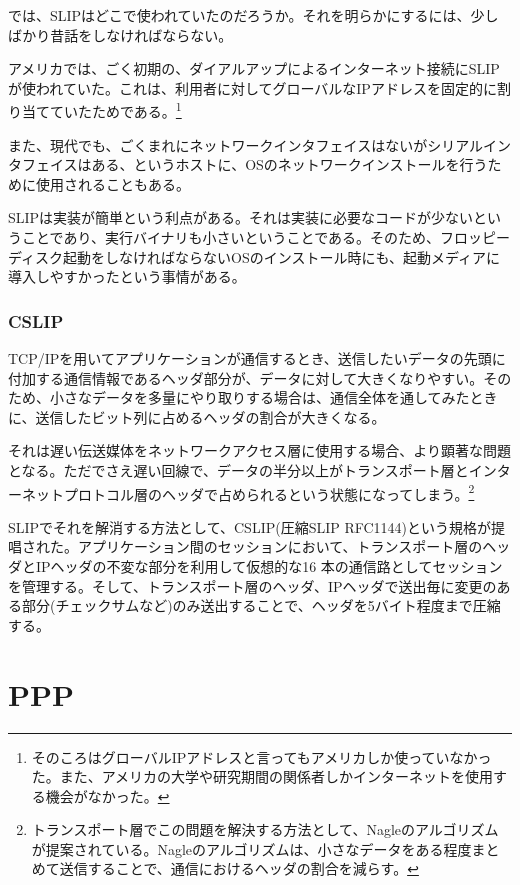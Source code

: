 では、SLIPはどこで使われていたのだろうか。それを明らかにするには、少しばかり昔話をしなければならない。

アメリカでは、ごく初期の、ダイアルアップによるインターネット接続にSLIPが使われていた。これは、利用者に対してグローバルなIPアドレスを固定的に割り当てていたためである。\footnote{そのころはグローバルIPアドレスと言ってもアメリカしか使っていなかった。また、アメリカの大学や研究期間の関係者しかインターネットを使用する機会がなかった。}

また、現代でも、ごくまれにネットワークインタフェイスはないがシリアルインタフェイスはある、というホストに、OSのネットワークインストールを行うために使用されることもある。

SLIPは実装が簡単という利点がある。それは実装に必要なコードが少ないということであり、実行バイナリも小さいということである。そのため、フロッピーディスク起動をしなければならないOSのインストール時にも、起動メディアに導入しやすかったという事情がある。

\subsubsection{CSLIP}

TCP/IPを用いてアプリケーションが通信するとき、送信したいデータの先頭に付加する通信情報であるヘッダ部分が、データに対して大きくなりやすい。そのため、小さなデータを多量にやり取りする場合は、通信全体を通してみたときに、送信したビット列に占めるヘッダの割合が大きくなる。

それは遅い伝送媒体をネットワークアクセス層に使用する場合、より顕著な問題となる。ただでさえ遅い回線で、データの半分以上がトランスポート層とインターネットプロトコル層のヘッダで占められるという状態になってしまう。\footnote{トランスポート層でこの問題を解決する方法として、Nagleのアルゴリズムが提案されている。Nagleのアルゴリズムは、小さなデータをある程度まとめて送信することで、通信におけるヘッダの割合を減らす。}

SLIPでそれを解消する方法として、CSLIP(圧縮SLIP RFC1144)という規格が提唱された。アプリケーション間のセッションにおいて、トランスポート層のヘッダとIPヘッダの不変な部分を利用して仮想的な16 本の通信路としてセッションを管理する。そして、トランスポート層のヘッダ、IPヘッダで送出毎に変更のある部分(チェックサムなど)のみ送出することで、ヘッダを5バイト程度まで圧縮する。

\section{PPP}


